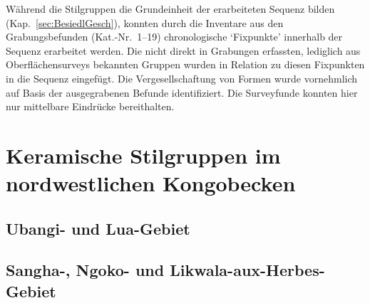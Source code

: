 Während die Stilgruppen die Grundeinheit der erarbeiteten Sequenz bilden (Kap.~\ref{sec:BesiedlGesch}), konnten durch die Inventare aus den Grabungsbefunden (Kat.-Nr.~1--19) chronologische \enquote*{Fixpunkte} innerhalb der Sequenz erarbeitet werden. Die nicht direkt in Grabungen erfassten, lediglich aus Oberflächensurveys bekannten Gruppen wurden in Relation zu diesen Fixpunkten in die Sequenz eingefügt. Die Vergesellschaftung von Formen wurde vornehmlich auf Basis der ausgegrabenen Befunde identifiziert. Die Surveyfunde konnten hier nur mittelbare Eindrücke bereithalten.

\section{Keramische Stilgruppen im nordwestlichen Kongobecken}\label{sec:StilGr_nwCongo}

\subsection{Ubangi- und Lua-Gebiet}
























\subsection{Sangha-, Ngoko- und Likwala-aux-Herbes-Gebiet}











